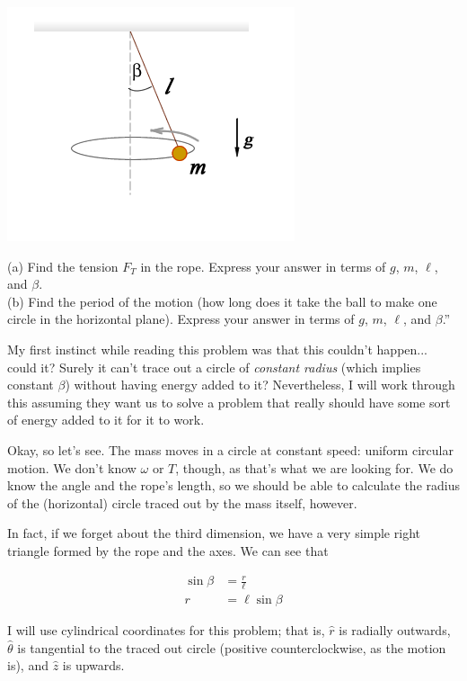 \documentclass[12pt,a4paper]{report}
\begin{document}
\begin{center}
\includegraphics[scale=1.0]{Graphics/h3p9}
\end{center}

(a) Find the tension $F_T$ in the rope. Express your answer in terms of $g$, $m$, $\ell$, and $\beta$.\\
(b) Find the period of the motion (how long does it take the ball to make one circle in the horizontal plane). Express your answer in terms of $g$, $m$, $\ell$, and $\beta$.''

My first instinct while reading this problem was that this couldn't happen... could it? Surely it can't trace out a circle of \emph{constant radius} (which implies constant $\beta$) without having energy added to it? Nevertheless, I will work through this assuming they want us to solve a problem that really should have some sort of energy added to it for it to work.

Okay, so let's see. The mass moves in a circle at constant speed: uniform circular motion. We don't know $\omega$ or $T$, though, as that's what we are looking for. We do know the angle and the rope's length, so we should be able to calculate the radius of the (horizontal) circle traced out by the mass itself, however.

In fact, if we forget about the third dimension, we have a very simple right triangle formed by the rope and the axes. We can see that

\begin{align}
\sin \beta &= \frac{r}{\ell}\\
r &= \ell \sin \beta
\end{align}

I will use cylindrical coordinates for this problem; that is, $\hat{r}$ is radially outwards, $\hat{\theta}$ is tangential to the traced out circle (positive counterclockwise, as the motion is), and $\hat{z}$ is upwards.
\end{document}
